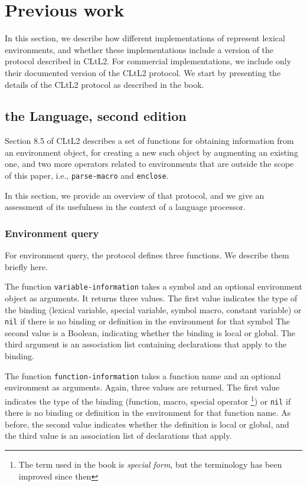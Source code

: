 \section{Previous work}

In this section, we describe how different implementations of
\commonlisp{} represent lexical environments, and whether these
implementations include a version of the protocol described in CLtL2.
For commercial implementations, we include only their documented
version of the CLtL2 protocol.  We start by presenting the details of
the CLtL2 protocol as described in the book.

\subsection{\commonlisp{} the Language, second edition}

Section 8.5 of CLtL2 describes a set of functions for obtaining
information from an environment object, for creating a new such object
by augmenting an existing one, and two more operators related to
environments that are outside the scope of this paper, i.e.,
\texttt{parse-macro} and \texttt{enclose}.

In this section, we provide an overview of that protocol, and we give
an assessment of its usefulness in the context of a language processor.

\subsubsection{Environment query}

For environment query, the protocol defines three functions.  We
describe them briefly here.

The function \texttt{variable-information} takes a symbol and an
optional environment object as arguments.  It returns three values.
The first value indicates the type of the binding (lexical variable,
special variable, symbol macro, constant variable) or \texttt{nil} if
there is no binding or definition in the environment for that symbol
The second value is a Boolean, indicating whether the binding is local
or global.  The third argument is an association list containing
declarations that apply to the binding.

The function \texttt{function-information} takes a function name and
an optional environment as arguments.  Again, three values are
returned.  The first value indicates the type of the binding
(function, macro, special operator%
\footnote{The term used in the book is \emph{special form}, but the
  terminology has been improved since then}) or \texttt{nil} if there
is no binding or definition in the environment for that function name.
As before, the second value indicates whether the definition is local
or global, and the third value is an association list of declarations
that apply.

